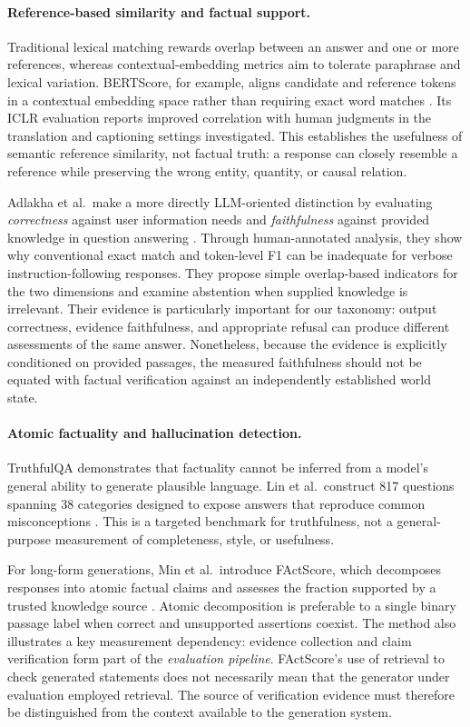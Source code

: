 \paragraph{Reference-based similarity and factual support.}
Traditional lexical matching rewards overlap between an answer and one or more references, whereas contextual-embedding metrics aim to tolerate paraphrase and lexical variation. BERTScore, for example, aligns candidate and reference tokens in a contextual embedding space rather than requiring exact word matches \cite{zhang2020bertscore}. Its ICLR evaluation reports improved correlation with human judgments in the translation and captioning settings investigated. This establishes the usefulness of semantic reference similarity, not factual truth: a response can closely resemble a reference while preserving the wrong entity, quantity, or causal relation.

Adlakha et al.\ make a more directly LLM-oriented distinction by evaluating \emph{correctness} against user information needs and \emph{faithfulness} against provided knowledge in question answering \cite{adlakha2024correctness}. Through human-annotated analysis, they show why conventional exact match and token-level F1 can be inadequate for verbose instruction-following responses. They propose simple overlap-based indicators for the two dimensions and examine abstention when supplied knowledge is irrelevant. Their evidence is particularly important for our taxonomy: output correctness, evidence faithfulness, and appropriate refusal can produce different assessments of the same answer. Nonetheless, because the evidence is explicitly conditioned on provided passages, the measured faithfulness should not be equated with factual verification against an independently established world state.

\paragraph{Atomic factuality and hallucination detection.}
TruthfulQA demonstrates that factuality cannot be inferred from a model's general ability to generate plausible language. Lin et al.\ construct 817 questions spanning 38 categories designed to expose answers that reproduce common misconceptions \cite{lin2022truthfulqa}. This is a targeted benchmark for truthfulness, not a general-purpose measurement of completeness, style, or usefulness.

For long-form generations, Min et al.\ introduce FActScore, which decomposes responses into atomic factual claims and assesses the fraction supported by a trusted knowledge source \cite{min2023factscore}. Atomic decomposition is preferable to a single binary passage label when correct and unsupported assertions coexist. The method also illustrates a key measurement dependency: evidence collection and claim verification form part of the \emph{evaluation pipeline}. FActScore's use of retrieval to check generated statements does not necessarily mean that the generator under evaluation employed retrieval. The source of verification evidence must therefore be distinguished from the context available to the generation system.

